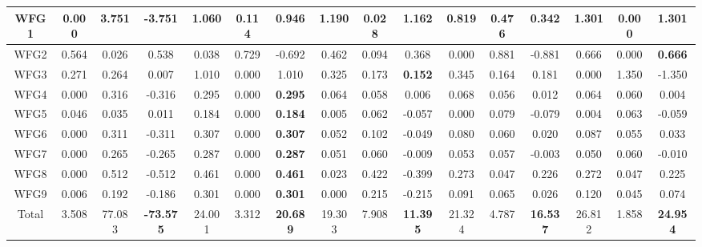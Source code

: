 \begin{table}[h]
{\begin{tabular}{|c|c|c|c|c|c|c|c|c|c|c|c|c|c|c|c|}
WFG1 & 0.000 & 3.751 & -3.751 & 1.060 & 0.114 & 0.946 & 1.190 & 0.028 & 1.162 & 0.819 & 0.476 & 0.342 & 1.301 & 0.000 & \textbf{1.301} \\ \hline
WFG2 & 0.564 & 0.026 & 0.538 & 0.038 & 0.729 & -0.692 & 0.462 & 0.094 & 0.368 & 0.000 & 0.881 & -0.881 & 0.666 & 0.000 & \textbf{0.666} \\ \hline
WFG3 & 0.271 & 0.264 & 0.007 & 1.010 & 0.000 & 1.010 & 0.325 & 0.173 & \textbf{0.152} & 0.345 & 0.164 & 0.181 & 0.000 & 1.350 & -1.350 \\ \hline
WFG4 & 0.000 & 0.316 & -0.316 & 0.295 & 0.000 & \textbf{0.295} & 0.064 & 0.058 & 0.006 & 0.068 & 0.056 & 0.012 & 0.064 & 0.060 & 0.004 \\ \hline
WFG5 & 0.046 & 0.035 & 0.011 & 0.184 & 0.000 & \textbf{0.184} & 0.005 & 0.062 & -0.057 & 0.000 & 0.079 & -0.079 & 0.004 & 0.063 & -0.059 \\ \hline
WFG6 & 0.000 & 0.311 & -0.311 & 0.307 & 0.000 & \textbf{0.307} & 0.052 & 0.102 & -0.049 & 0.080 & 0.060 & 0.020 & 0.087 & 0.055 & 0.033 \\ \hline
WFG7 & 0.000 & 0.265 & -0.265 & 0.287 & 0.000 & \textbf{0.287} & 0.051 & 0.060 & -0.009 & 0.053 & 0.057 & -0.003 & 0.050 & 0.060 & -0.010 \\ \hline
WFG8 & 0.000 & 0.512 & -0.512 & 0.461 & 0.000 & \textbf{0.461} & 0.023 & 0.422 & -0.399 & 0.273 & 0.047 & 0.226 & 0.272 & 0.047 & 0.225 \\ \hline
WFG9 & 0.006 & 0.192 & -0.186 & 0.301 & 0.000 & \textbf{0.301} & 0.000 & 0.215 & -0.215 & 0.091 & 0.065 & 0.026 & 0.120 & 0.045 & 0.074 \\ \hline
Total & 3.508 & 77.083 & \textbf{-73.575} & 24.001 & 3.312 & \textbf{20.689} & 19.303 & 7.908 & \textbf{11.395} & 21.324 & 4.787 & \textbf{16.537} & 26.812 & 1.858 & \textbf{24.954} \\ \hline
\end{tabular}%
}
\end{table}

